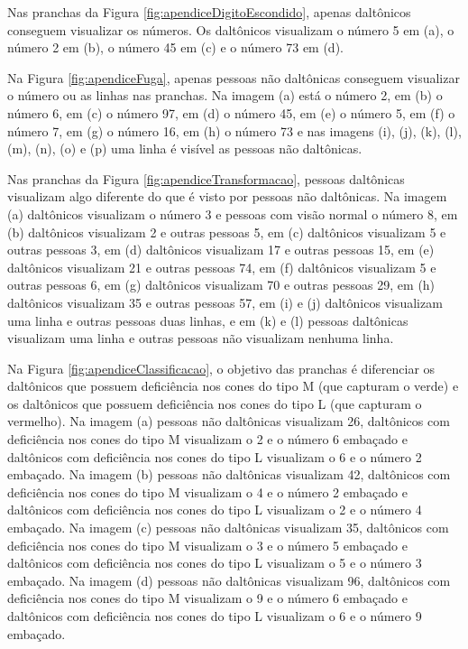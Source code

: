 \documentclass[	12pt, Times, openright, twoside, a4paper, english, brazil]{abntex2}
\begin{document}
\begin{apendicesenv}
Nas pranchas da Figura \ref{fig:apendiceDigitoEscondido}, apenas daltônicos conseguem visualizar os números. Os daltônicos visualizam o número 5 em (a), o número 2 em (b), o número 45 em (c) e o número 73 em (d).

Na Figura \ref{fig:apendiceFuga},  apenas pessoas não daltônicas conseguem visualizar o número ou as linhas nas pranchas. Na imagem (a) está o número 2, em (b) o número 6, em (c) o número 97, em (d) o número 45, em (e) o número 5, em (f) o número 7, em (g) o número 16, em (h) o número 73 e nas imagens (i), (j), (k), (l), (m), (n), (o) e (p) uma linha é visível as pessoas não daltônicas.

Nas pranchas da Figura \ref{fig:apendiceTransformacao}, pessoas daltônicas visualizam algo diferente do que é visto por pessoas não daltônicas. Na imagem (a) daltônicos visualizam o número 3 e pessoas com visão normal o número 8, em (b) daltônicos visualizam 2 e outras pessoas 5, em (c) daltônicos visualizam 5 e outras pessoas 3, em (d) daltônicos visualizam 17 e outras pessoas 15, em (e) daltônicos visualizam 21 e outras pessoas 74, em (f) daltônicos visualizam 5 e outras pessoas 6, em (g) daltônicos visualizam 70 e outras pessoas 29, em (h) daltônicos visualizam 35 e outras pessoas 57, em (i) e (j) daltônicos visualizam uma linha e outras pessoas duas linhas, e em (k) e (l) pessoas daltônicas visualizam uma linha e outras pessoas não visualizam nenhuma linha.

Na Figura \ref{fig:apendiceClassificacao}, o objetivo das pranchas é diferenciar os daltônicos que possuem deficiência nos cones do tipo M (que capturam o verde) e os daltônicos que possuem deficiência nos cones do tipo L (que capturam o vermelho). Na imagem (a) pessoas não daltônicas visualizam 26, daltônicos com deficiência nos cones do tipo M visualizam o 2 e o número 6 embaçado e daltônicos com deficiência nos cones do tipo L visualizam o 6 e o número 2 embaçado. Na imagem (b) pessoas não daltônicas visualizam 42, daltônicos com deficiência nos cones do tipo M visualizam o 4 e o número 2 embaçado e daltônicos com deficiência nos cones do tipo L visualizam o 2 e o número 4 embaçado. Na imagem (c) pessoas não daltônicas visualizam 35, daltônicos com deficiência nos cones do tipo M visualizam o 3 e o número 5 embaçado e daltônicos com deficiência nos cones do tipo L visualizam o 5 e o número 3 embaçado. Na imagem (d) pessoas não daltônicas visualizam 96, daltônicos com deficiência nos cones do tipo M visualizam o 9 e o número 6 embaçado e daltônicos com deficiência nos cones do tipo L visualizam o 6 e o número 9 embaçado. 


\end{apendicesenv}
\end{document}
